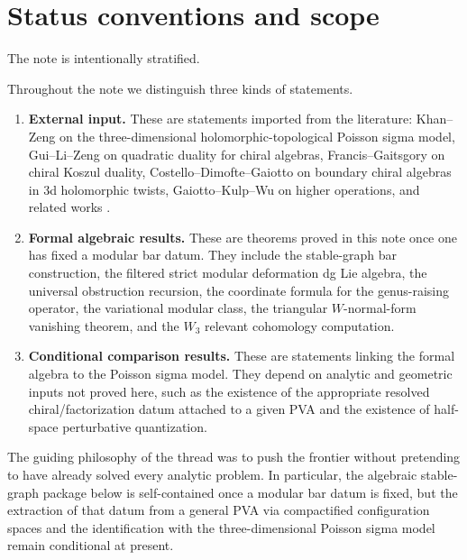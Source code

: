 \tableofcontents

\section{Status conventions and scope}

The note is intentionally stratified.

\begin{convention}
Throughout the note we distinguish three kinds of statements.
\begin{enumerate}[leftmargin=2.4em]
\item \textbf{External input.} These are statements imported from the literature:
Khan--Zeng on the three-dimensional holomorphic-topological Poisson sigma model,
Gui--Li--Zeng on quadratic duality for chiral algebras, Francis--Gaitsgory on chiral
Koszul duality, Costello--Dimofte--Gaiotto on boundary chiral algebras in 3d
holomorphic twists, Gaiotto--Kulp--Wu on higher operations, and related works
\cite{KZ25,GLZ22,FG12,CDG20,GKW25}.
\item \textbf{Formal algebraic results.} These are theorems proved in this note once one
has fixed a modular bar datum. They include the stable-graph bar construction, the
filtered strict modular deformation dg Lie algebra, the universal obstruction recursion, the coordinate
formula for the genus-raising operator, the variational modular class, the triangular
$W$-normal-form vanishing theorem, and the $W_3$ relevant cohomology computation.
\item \textbf{Conditional comparison results.} These are statements linking the formal
algebra to the Poisson sigma model. They depend on analytic and geometric inputs
not proved here, such as the existence of the appropriate resolved chiral/factorization
datum attached to a given PVA and the existence of half-space perturbative quantization.
\end{enumerate}
\end{convention}

\begin{remark}
The guiding philosophy of the thread was to push the frontier without pretending to
have already solved every analytic problem. In particular, the algebraic stable-graph
package below is self-contained once a modular bar datum is fixed, but the extraction of
that datum from a general PVA via compactified configuration spaces and the identification
with the three-dimensional Poisson sigma model remain conditional at present.
\end{remark}

